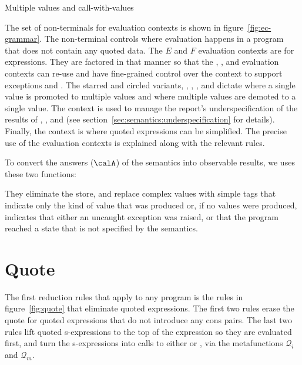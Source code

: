 \beginfig
\begin{center}

\end{center}
\caption{Multiple values and call-with-values}\label{fig:Multiple--values--and--call-with-values}
\endfig

The set of non-terminals for evaluation contexts is shown in
figure~\ref{fig:ec-grammar}. The  non-terminal controls where
evaluation happens in a program that does not contain any quoted data.
The $E$ and $F$ evaluation contexts are for expressions.  They are factored in
that manner so that the , , and  evaluation contexts can
re-use  and have fine-grained control over the context to support
exceptions and . The starred and circled variants,
\Estar{}, \Eo{}, \Fstar{}, and \Fo{} dictate where a single value is
promoted to multiple values and where multiple values are demoted to a
single value. The  context is used to manage the report's underspecification of the results of , , and  (see section~\ref{sec:semantics:underspecification} for details). Finally, the  context is where quoted expressions can be simplified. The precise use of the evaluation contexts is explained along with the relevant rules.

To convert the answers ($\calA$)  of the semantics into observable results, we uses these two functions:


They eliminate the store, and replace complex values with simple tags that indicate only the kind of value that was produced or, if no values were produced, indicates that either an uncaught exception was raised, or that the program reached a state that is not specified by the semantics.

\section{Quote}\label{sec:semantics:quote}

The first reduction rules that apply to any program is the 
rules in figure~\ref{fig:quote} that eliminate quoted expressions. 
The first two rules erase the quote for quoted expressions that do not introduce any cons pairs.
The last two rules lift quoted s-expressions to the top of the expression so they are evaluated first, and turn the s-expressions into calls to either  or , via the metafunctions $\mathscr{Q}_i$ and $\mathscr{Q}_m$.

